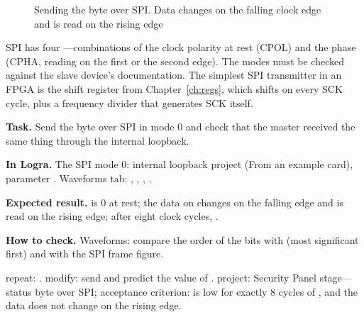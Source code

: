 \begin{figure}[H]
\centering
{}
\caption{Sending the byte  over SPI. Data changes on the falling clock edge and is read on the rising edge}
\end{figure}

SPI has four ---combinations of the clock polarity at rest (CPOL)
and the phase (CPHA, reading on the first or the second edge). The modes must
be checked against the slave device's documentation. The simplest SPI
transmitter in an FPGA is the shift register from Chapter~\ref{ch:regs}, which
shifts on every SCK cycle, plus a frequency divider that generates SCK itself.

\begin{diybox}
\textbf{Task.} Send the byte  over SPI in mode 0 and check that the master received the same thing through the internal loopback.

\textbf{In Logra.} The SPI mode 0: internal loopback project (From an example card), parameter . Waveforms tab: , , , .

\textbf{Expected result.}  is 0 at rest; the data on  changes on the falling edge and is read on the rising edge; after eight clock cycles, .

\textbf{How to check.} Waveforms: compare the order of the  bits with  (most significant first) and with the SPI frame figure.

 repeat: .  modify: send  and predict the value of .  project: Security Panel stage---status byte over SPI; acceptance criterion:  is low for exactly 8 cycles of , and the data does not change on the rising edge.
\end{diybox}

